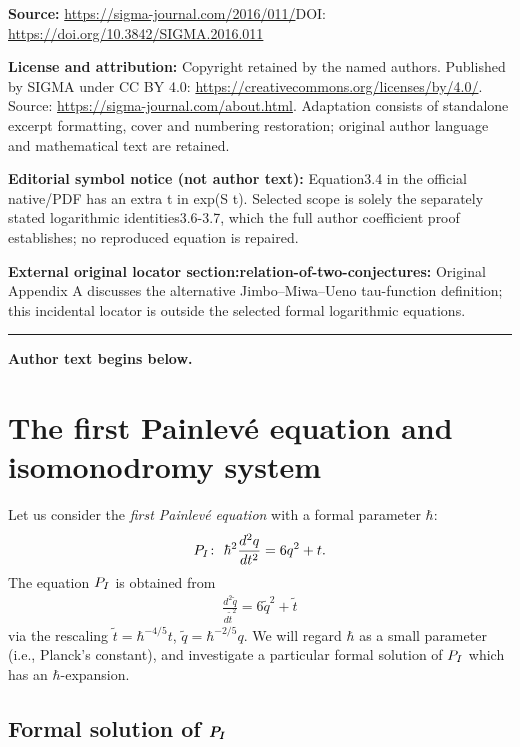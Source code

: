 \documentclass[11pt]{article}
\theoremstyle{definition}
\numberwithin{equation}{section}
\def\PI{P_{\rm I}}
\begin{document}
\noindent\textbf{Source:} \url{https://sigma-journal.com/2016/011/}\quad DOI: \url{https://doi.org/10.3842/SIGMA.2016.011}\par
\noindent\textbf{License and attribution:} Copyright retained by the named authors. Published by SIGMA under CC BY 4.0: \url{https://creativecommons.org/licenses/by/4.0/}. Source: \url{https://sigma-journal.com/about.html}. Adaptation consists of standalone excerpt formatting, cover and numbering restoration; original author language and mathematical text are retained.\par
\noindent\textbf{Editorial symbol notice (not author text):} Equation3.4 in the official native/PDF has an extra t in exp(S t). Selected scope is solely the separately stated logarithmic identities3.6-3.7, which the full author coefficient proof establishes; no reproduced equation is repaired.\par
\noindent\textbf{External original locator section:relation-of-two-conjectures:} Original Appendix A discusses the alternative Jimbo–Miwa–Ueno tau-function definition; this incidental locator is outside the selected formal logarithmic equations.\par
\medskip\hrule\medskip\noindent\textbf{Author text begins below.}\par
\setcounter{section}{1}
\setcounter{subsection}{0}
\setcounter{subsubsection}{0}
\setcounter{thm}{2}
\setcounter{equation}{2}
\section{The f\/irst Painlev\'e equation and isomonodromy system}\label{section2}


Let us consider the {\em first Painlev\'e equation}
with a formal parameter $\hbar$:
\begin{gather*}
\PI\colon \
\hbar^{2} \frac{d^{2}q}{dt^{2}} = 6q^{2} + t.
\end{gather*}
The equation $\PI$ is obtained from
\begin{gather*}
\frac{d^{2} \tilde{q}}{d\tilde{t}^{2}} =
6 \tilde{q}^{2} + \tilde{t}
\end{gather*}
via the rescaling
$\tilde{t} = \hbar^{-4/5} t$,
$\tilde{q} = \hbar^{-2/5} q$.
We will regard $\hbar$ as a small parameter (i.e., Planck's constant),
and investigate a particular formal solution
of $\PI$ which has an $\hbar$-expansion.

\subsection[Formal solution of $\PI$]{Formal solution of $\boldsymbol{\PI}$}
\end{document}
